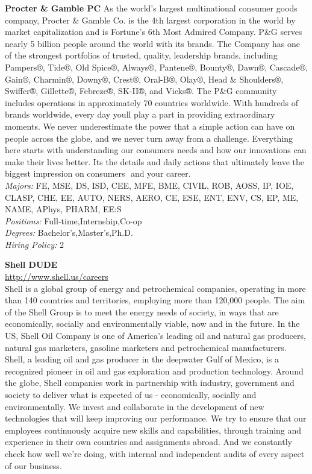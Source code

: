 \documentclass[twoside]{article}
\begin{document}
\begin{center}
\begin{multicols}{2}
\begin{minipage}{.95\columnwidth}{\Large\bf Procter \& Gamble \hfill PC}
    As the world's largest multinational consumer goods company, Procter \& Gamble Co. is the 4th largest corporation in the world by market capitalization and is Fortune's 6th Most Admired Company. P\&G serves nearly 5 billion people around the world with its brands. The Company has one of the strongest portfolios of trusted, quality, leadership brands, including Pampers®, Tide®, Old Spice®, Always®, Pantene®, Bounty®, Dawn®, Cascade®, Gain®, Charmin®, Downy®, Crest®, Oral-B®, Olay®, Head \& Shoulders®, Swiffer®, Gillette®, Febreze®, SK-II®, and Vicks®. The P\&G community includes operations in approximately 70 countries worldwide. With hundreds of brands worldwide, every day youll play a part in providing extraordinary moments. We never underestimate the power that a simple action can have on people across the globe, and we never turn away from a challenge. Everything here starts with understanding our consumers needs and how our innovations can make their lives better. Its the details and daily actions that ultimately leave the biggest impression on consumers  and your career.\\
    \emph{Majors:} FE, MSE, DS, ISD, CEE, MFE, BME, CIVIL, ROB, AOSS, IP, IOE, CLASP, CHE, EE, AUTO, NERS, AERO, CE, ESE, ENT, ENV, CS, EP, ME, NAME, APhys, PHARM, EE:S\\
    \emph{Positions:} Full-time,Internship,Co-op\\
    \emph{Degrees:} Bachelor's,Master's,Ph.D.\\
    \emph{Hiring Policy:} 2\\
\end{minipage}
 \begin{minipage}{.95\columnwidth}{\Large\bf Shell \hfill DUDE}\\
    \url{http://www.shell.us/careers}\\
    Shell is a global group of energy and petrochemical companies, operating in more than 140 countries and territories, employing more than 120,000 people. The aim of the Shell Group is to meet the energy needs of society, in ways that are economically, socially and environmentally viable, now and in the future. In the US, Shell Oil Company is one of America's leading oil and natural gas producers, natural gas marketers, gasoline marketers and petrochemical manufacturers. Shell, a leading oil and gas producer in the deepwater Gulf of Mexico, is a recognized pioneer in oil and gas exploration and production technology. Around the globe, Shell companies work in partnership with industry, government and society to deliver what is expected of us - economically, socially and environmentally. We invest and collaborate in the development of new technologies that will keep improving our performance. We try to ensure that our employees continuously acquire new skills and capabilities, through training and experience in their own countries and assignments abroad. And we constantly check how well we're doing, with internal and independent audits of every aspect of our business.\\

\end{minipage}
\end{multicols}
\end{center}
\end{document}
